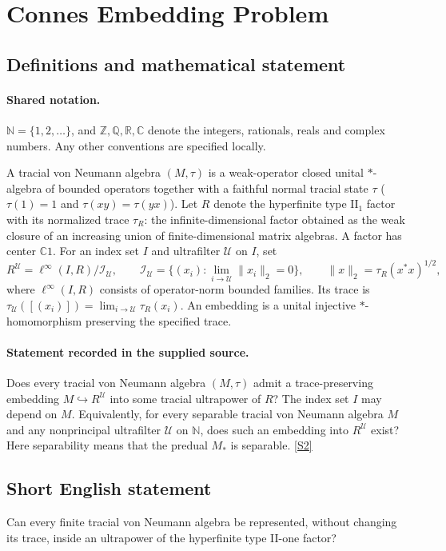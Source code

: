 \documentclass[11pt]{article}
\newcommand{\sref}[2]{\hyperlink{source:#1:#2}{[S#2]}}
\begin{document}
\section{Connes Embedding Problem}\label{statement}

\subsection{Definitions and mathematical statement}

\paragraph{Shared notation.}$\mathbb N=\{1,2,\ldots\}$, and $\mathbb Z,\mathbb Q,\mathbb R,\mathbb C$ denote the integers, rationals, reals and complex numbers. Any other conventions are specified locally.


A tracial von Neumann algebra $(M,\tau)$ is a weak-operator closed unital $*$-algebra of bounded operators together with a faithful normal tracial state $\tau$ ($\tau(1)=1$ and $\tau(xy)=\tau(yx)$). Let $R$ denote the hyperfinite type $\mathrm{II}_1$ factor with its normalized trace $\tau_R$: the infinite-dimensional factor obtained as the weak closure of an increasing union of finite-dimensional matrix algebras. A factor has center $\mathbb C1$. For an index set $I$ and ultrafilter $\mathcal U$ on $I$, set
\[
 R^{\mathcal U}=\ell^\infty(I,R)/\mathcal I_{\mathcal U},\qquad
 \mathcal I_{\mathcal U}=\{(x_i):\lim_{i\to\mathcal U}\|x_i\|_2=0\},
 \qquad\|x\|_2=\tau_R(x^*x)^{1/2},
\]
where $\ell^\infty(I,R)$ consists of operator-norm bounded families. Its trace is $\tau_{\mathcal U}([(x_i)])=\lim_{i\to\mathcal U}\tau_R(x_i)$. An embedding is a unital injective $*$-homomorphism preserving the specified trace.
\paragraph{Statement recorded in the supplied source.}
Does every tracial von Neumann algebra $(M,\tau)$ admit a trace-preserving embedding $M\hookrightarrow R^{\mathcal U}$ into some tracial ultrapower of $R$? The index set $I$ may depend on $M$. Equivalently, for every separable tracial von Neumann algebra $M$ and any nonprincipal ultrafilter $\mathcal U$ on $\mathbb N$, does such an embedding into $R^{\mathcal U}$ exist? Here separability means that the predual $M_*$ is separable. \sref{statement}{2}
\subsection{Short English statement}
Can every finite tracial von Neumann algebra be represented, without changing its trace, inside an ultrapower of the hyperfinite type II-one factor?
\end{document}
